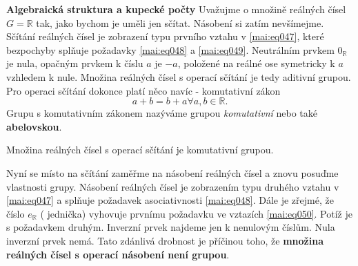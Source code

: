 \begin{mdframed}[style=mdexam]
  \begin{example}\label{mai:exam047}
    \textbf{Algebraická struktura a kupecké počty}\newline
      Uvažujme o množině reálných čísel \(G = \mathbb{R}\) tak, jako bychom je uměli jen sčítat.
      Násobení si zatím nevšímejme. Sčítání reálných čísel je zobrazení typu prvního vztahu v
      \ref{mai:eq047}, které bezpochyby splňuje požadavky \ref{mai:eq048} a \ref{mai:eq049}.
      Neutrálním prvkem \(0_{\mathbb{R}}\) je  nula, opačným prvkem k číslu \(a\) je
      \(-a\), položené na reálné ose symetricky k \(a\) vzhledem k nule. Množina reálných čísel s
      operací sčítání je tedy aditivní grupou. Pro operaci sčítání dokonce platí něco navíc -
      komutativní zákon
      \begin{equation}\label{mai:eq051}
        a + b = b + a \forall a,b\in\mathbb{R}.
      \end{equation} 
      Grupu s komutativním zákonem nazýváme grupou \emph{komutativní} nebo také \textbf{abelovskou}.
      
      \begin{mdframed}[style=highlight]
        Množina reálných čísel s operací sčítání je komutativní grupou.
      \end{mdframed}
      
      Nyní se místo na sčítání zaměřme na násobení reálných čísel a znovu posuďme vlastnosti grupy.
      Násobení reálných čísel je zobrazením typu druhého vztahu v \ref{mai:eq047} a splňuje
      požadavek asociativnosti \ref{mai:eq048}. Dále je zřejmé, že číslo \(e_{\mathbb{R}}\)
      ( jednička) vyhovuje prvnímu požadavku ve vztazích \ref{mai:eq050}. Potíž je s
      požadavkem druhým. Inverzní prvek najdeme jen k nenulovým číslům. Nula inverzní prvek nemá.
      Tato zdánlivá drobnost je příčinou toho, že \textbf{množina reálných čísel s operací násobení
      není grupou}.
  \end{example}
\end{mdframed}